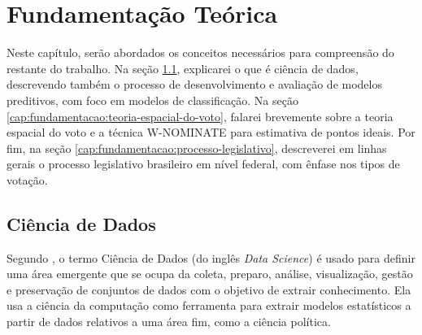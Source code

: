 \documentclass[a4paper,titlepage]{ppgi}\usepackage[]{graphicx}\usepackage[]{color}
\begin{document}
%
%






\chapter{Fundamentação Teórica}\label{cap:fundamentacao}

Neste capítulo, serão abordados os conceitos necessários para compreensão do
restante do trabalho. Na seção \ref{cap:fundamentacao:ciencia-de-dados},
explicarei o que é ciência de dados, descrevendo também o processo de
desenvolvimento e avaliação de modelos preditivos, com foco em modelos de
classificação. Na seção \ref{cap:fundamentacao:teoria-espacial-do-voto},
falarei brevemente sobre a teoria espacial do voto e a técnica W-NOMINATE para
estimativa de pontos ideais. Por fim, na seção
\ref{cap:fundamentacao:processo-legislativo}, descreverei em linhas gerais o
processo legislativo brasileiro em nível federal, com ênfase nos tipos de
votação.

\section{Ciência de Dados}
\label{cap:fundamentacao:ciencia-de-dados}

Segundo , o termo Ciência de Dados (do inglês
\emph{Data Science}) é usado para definir uma área emergente que se ocupa da
coleta, preparo, análise, visualização, gestão e preservação de conjuntos de
dados com o objetivo de extrair conhecimento. Ela usa a ciência da computação
como ferramenta para extrair modelos estatísticos a partir de dados relativos a
uma área fim, como a ciência política.
\end{document}
